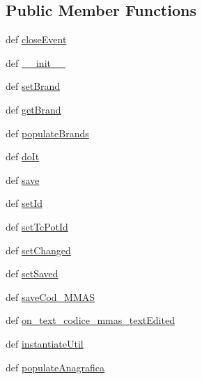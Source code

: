 \subsection*{Public Member Functions}
\begin{DoxyCompactItemize}
\item 
def \hyperlink{classmmasgis_1_1anagrafica_1_1MainWindowAnagrafica_ada13f3abef40ecca078a9b262af95f4b}{closeEvent}
\item 
def \hyperlink{classmmasgis_1_1anagrafica_1_1MainWindowAnagrafica_a45f684a0781def8ddbe869fd55708ce1}{\_\-\_\-init\_\-\_\-}
\item 
def \hyperlink{classmmasgis_1_1anagrafica_1_1MainWindowAnagrafica_a67042f611c90f10949271108ca4a5bbf}{setBrand}
\item 
def \hyperlink{classmmasgis_1_1anagrafica_1_1MainWindowAnagrafica_a15e1220517520d15a121ee261b73f190}{getBrand}
\item 
def \hyperlink{classmmasgis_1_1anagrafica_1_1MainWindowAnagrafica_a70a6102efc89f63a6281c14d208aafda}{populateBrands}
\item 
def \hyperlink{classmmasgis_1_1anagrafica_1_1MainWindowAnagrafica_ad1acac0b983c0e0df421c4a5e6ae51ca}{doIt}
\item 
def \hyperlink{classmmasgis_1_1anagrafica_1_1MainWindowAnagrafica_a18c8e75957b7cf73fdb2bef6ee8fbf69}{save}
\item 
def \hyperlink{classmmasgis_1_1anagrafica_1_1MainWindowAnagrafica_a922b9a519aa153fe02c0529a3aefc341}{setId}
\item 
def \hyperlink{classmmasgis_1_1anagrafica_1_1MainWindowAnagrafica_ae3210b0d21e8bc728d3b55f1e8eca8ab}{setTcPotId}
\item 
def \hyperlink{classmmasgis_1_1anagrafica_1_1MainWindowAnagrafica_ac736af24ba373167c55c7749696d94ca}{setChanged}
\item 
def \hyperlink{classmmasgis_1_1anagrafica_1_1MainWindowAnagrafica_ae5e34a8ada284338a34f45120a137cf7}{setSaved}
\item 
def \hyperlink{classmmasgis_1_1anagrafica_1_1MainWindowAnagrafica_ada6682071eac2ffe75fd0721379fe6f4}{saveCod\_\-MMAS}
\item 
def \hyperlink{classmmasgis_1_1anagrafica_1_1MainWindowAnagrafica_abe77a5879a9707014b871e891e571dbc}{on\_\-text\_\-codice\_\-mmas\_\-textEdited}
\item 
def \hyperlink{classmmasgis_1_1anagrafica_1_1MainWindowAnagrafica_a58bc7e467f3ff0c2f4cc5263cf83a6b7}{instantiateUtil}
\item 
def \hyperlink{classmmasgis_1_1anagrafica_1_1MainWindowAnagrafica_a3afa3d14ad2f52d4c8b8f24485811c50}{populateAnagrafica}

\end{DoxyCompactItemize}

